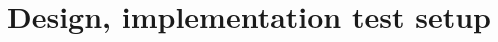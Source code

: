 \documentclass[Main]{subfiles}
\begin{document}
\section{Design, implementation test setup} %
\label{sec:design_implementation_test_setup}

\end{document}

